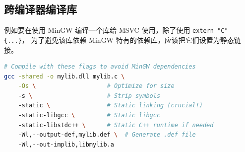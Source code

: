 \subsection{跨编译器编译库}
例如要在使用 MinGW 编译一个库给 MSVC 使用，除了使用 \verb`extern "C" {...}`， 为了避免该库依赖 MinGW 特有的依赖库，应该把它们设置为静态链接。
\begin{lstlisting}[language=bash]
# Compile with these flags to avoid MinGW dependencies
gcc -shared -o mylib.dll mylib.c \
    -Os \                    # Optimize for size
    -s \                     # Strip symbols
    -static \                # Static linking (crucial!)
    -static-libgcc \         # Static libgcc
    -static-libstdc++ \      # Static C++ runtime if needed
    -Wl,--output-def,mylib.def \  # Generate .def file
    -Wl,--out-implib,libmylib.a
\end{lstlisting}
